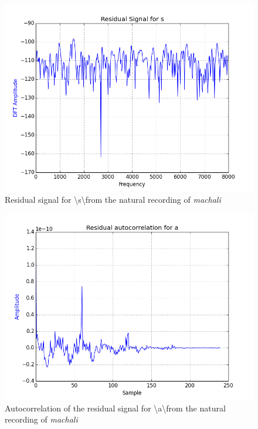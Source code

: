 \documentclass[a4paper]{article}
\begin{document}
\begin{figure}[h!]
    \includegraphics[width=\linewidth]{./images/res_sig_s.png}
    \caption{Residual signal for \textbackslash s\textbackslash from the natural recording of \textit{machali}}
    \label{fig:1}
\end{figure}




\begin{figure}[h!]
    \includegraphics[width=\linewidth]{./images/res_autocorr_a.png}
    \caption{Autocorrelation of the residual signal for  \textbackslash a\textbackslash from the natural recording of \textit{machali}}
    \label{fig:1}
\end{figure}
\end{document}
